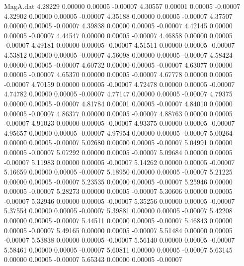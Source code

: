 \begin{filecontents}{MagA.dat}
   4.28229    0.00000    0.00005   -0.00007
   4.30557    0.00001    0.00005   -0.00007
   4.32902    0.00000    0.00005   -0.00007
   4.35188    0.00000    0.00005   -0.00007
   4.37507    0.00000    0.00005   -0.00007
   4.39838    0.00000    0.00005   -0.00007
   4.42145    0.00000    0.00005   -0.00007
   4.44547    0.00000    0.00005   -0.00007
   4.46858    0.00000    0.00005   -0.00007
   4.49181    0.00000    0.00005   -0.00007
   4.51511    0.00000    0.00005   -0.00007
   4.53812    0.00000    0.00005   -0.00007
   4.56098    0.00000    0.00005   -0.00007
   4.58424    0.00000    0.00005   -0.00007
   4.60732    0.00000    0.00005   -0.00007
   4.63077    0.00000    0.00005   -0.00007
   4.65370    0.00000    0.00005   -0.00007
   4.67778    0.00000    0.00005   -0.00007
   4.70159    0.00000    0.00005   -0.00007
   4.72478    0.00000    0.00005   -0.00007
   4.74782    0.00000    0.00005   -0.00007
   4.77147    0.00000    0.00005   -0.00007
   4.79375    0.00000    0.00005   -0.00007
   4.81784    0.00001    0.00005   -0.00007
   4.84010    0.00000    0.00005   -0.00007
   4.86377    0.00000    0.00005   -0.00007
   4.88763    0.00000    0.00005   -0.00007
   4.91023    0.00000    0.00005   -0.00007
   4.93375    0.00000    0.00005   -0.00007
   4.95657    0.00000    0.00005   -0.00007
   4.97954    0.00000    0.00005   -0.00007
   5.00264    0.00000    0.00005   -0.00007
   5.02680    0.00000    0.00005   -0.00007
   5.04991    0.00000    0.00005   -0.00007
   5.07292    0.00000    0.00005   -0.00007
   5.09684    0.00000    0.00005   -0.00007
   5.11983    0.00000    0.00005   -0.00007
   5.14262    0.00000    0.00005   -0.00007
   5.16659    0.00000    0.00005   -0.00007
   5.18950    0.00000    0.00005   -0.00007
   5.21225    0.00000    0.00005   -0.00007
   5.23535    0.00000    0.00005   -0.00007
   5.25946    0.00000    0.00005   -0.00007
   5.28273    0.00000    0.00005   -0.00007
   5.30606    0.00000    0.00005   -0.00007
   5.32946    0.00000    0.00005   -0.00007
   5.35256    0.00000    0.00005   -0.00007
   5.37554    0.00000    0.00005   -0.00007
   5.39881    0.00000    0.00005   -0.00007
   5.42208    0.00000    0.00005   -0.00007
   5.44511    0.00000    0.00005   -0.00007
   5.46843    0.00000    0.00005   -0.00007
   5.49165    0.00000    0.00005   -0.00007
   5.51484    0.00000    0.00005   -0.00007
   5.53838    0.00000    0.00005   -0.00007
   5.56140    0.00000    0.00005   -0.00007
   5.58461    0.00000    0.00005   -0.00007
   5.60811    0.00000    0.00005   -0.00007
   5.63145    0.00000    0.00005   -0.00007
   5.65343    0.00000    0.00005   -0.00007

\end{filecontents}
